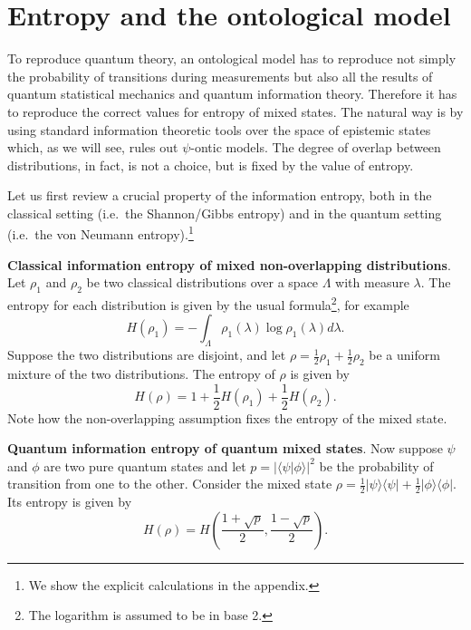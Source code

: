 \documentclass[twocolumn,prl,floatfix,superscriptaddress]{revtex4-2}
\begin{document}
\section{Entropy and the ontological model}

To reproduce quantum theory, an ontological model has to reproduce not simply the probability of transitions during measurements but also all the results of quantum statistical mechanics and quantum information theory. Therefore it has to reproduce the correct values for entropy of mixed states. The natural way is by using standard information theoretic tools over the space of epistemic states which, as we will see, rules out $\psi$-ontic models. The degree of overlap between distributions, in fact, is not a choice, but is fixed by the value of entropy.

Let us first review a crucial property of the information entropy, both in the classical setting (i.e.\ the Shannon/Gibbs entropy) and in the quantum setting (i.e.\ the von Neumann entropy).\footnote{We show the explicit calculations in the appendix.}

\textbf{Classical information entropy of mixed non-overlapping distributions}. Let $\rho_1$ and $\rho_2$ be two classical distributions over a space $\Lambda$ with measure $\lambda$. The entropy for each distribution is given by the usual formula\footnote{The logarithm is assumed to be in base 2.}, for example
\begin{equation}\label{shannon_entropy}
	H(\rho_1) = - \int_\Lambda \rho_1(\lambda) \log \rho_1(\lambda) d\lambda.
\end{equation}
Suppose the two distributions are disjoint, and let $\rho = \frac{1}{2} \rho_1 + \frac{1}{2} \rho_2$ be a uniform mixture of the two distributions. The entropy of $\rho$ is given by
\begin{equation}\label{entropy_nonoverlap}
	H(\rho) = 1 + \frac{1}{2} H(\rho_1) + \frac{1}{2} H(\rho_2).
\end{equation}
Note how the non-overlapping assumption fixes the entropy of the mixed state.

\textbf{Quantum information entropy of quantum mixed states}. Now suppose $\psi$ and $\phi$ are two pure quantum states and let $p = | \langle \psi | \phi \rangle |^2$ be the probability of transition from one to the other. Consider the mixed state $\rho = \frac{1}{2} | \psi \rangle \langle \psi | + \frac{1}{2} | \phi \rangle \langle \phi |$. Its entropy is given by
\begin{equation}\label{entropy_mixed}
	H(\rho) = H\left(\frac{1+\sqrt{p}}{2}, \frac{1-\sqrt{p}}{2}\right).
\end{equation}
\end{document}
